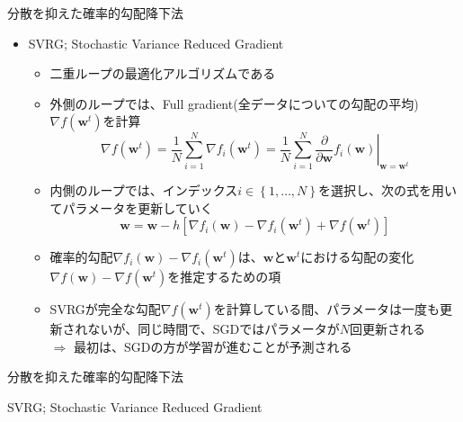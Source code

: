 \documentclass[dvipdfmx,notheorems,t]{beamer}
\begin{document}
\begin{frame}{分散を抑えた確率的勾配降下法}

\begin{itemize}
	\item SVRG; Stochastic Variance Reduced Gradient
	\begin{itemize}
		\item 二重ループの最適化アルゴリズムである
		\item 外側のループでは、Full gradient(全データについての勾配の平均)$\nabla f(\bm{w}^t)$を計算
		\begin{equation}
			\nabla f(\bm{w}^t) = \frac{1}{N} \sum_{i = 1}^N \nabla f_i(\bm{w}^t) = \frac{1}{N} \sum_{i = 1}^N \left. \frac{\partial}{\partial \bm{w}} f_i(\bm{w}) \right|_{\bm{w} = \bm{w}^t}
		\end{equation}
		
		\item 内側のループでは、インデックス$i \in \left\{ 1, \ldots, N \right\}$を選択し、次の式を用いてパラメータを更新していく
		\begin{equation}
			\bm{w} = \bm{w} - h \left[ \nabla f_i(\bm{w}) - \nabla f_i(\bm{w}^t) + \nabla f(\bm{w}^t) \right]
		\end{equation}
		
		\item 確率的勾配$\nabla f_i(\bm{w}) - \nabla f_i(\bm{w}^t)$は、$\bm{w}$と$\bm{w}^t$における勾配の変化$\nabla f(\bm{w}) - \nabla f(\bm{w}^t)$を\alert{推定するための項}
		\newline
		
		\item SVRGが完全な勾配$\nabla f(\bm{w}^t)$を計算している間、パラメータは一度も更新されないが、同じ時間で、SGDではパラメータが$N$回更新される \\
		$\Rightarrow$ 最初は、SGDの方が学習が進むことが予測される
	\end{itemize}
\end{itemize}

\end{frame}

\begin{frame}{分散を抑えた確率的勾配降下法}

\begin{algorithm}[H]
	\DontPrintSemicolon
	\caption{SVRG; Stochastic Variance Reduced Gradient~\cite{stochastic_2017}}
	\label{alg:svrg}
	\begin{algorithmic}[1]
			 
				 
			\ENDFOR
		\ENDFOR
	\end{algorithmic}
\end{algorithm}

\end{frame}
\end{document}
